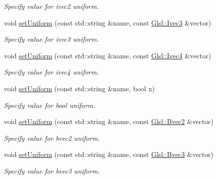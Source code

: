 \begin{DoxyCompactItemize}
\begin{DoxyCompactList}\small\item\em Specify value for {\ttfamily ivec2} uniform. \end{DoxyCompactList}\item 
void \mbox{\hyperlink{classsf_1_1_shader_a9e328e3e97cd753fdc7b842f4b0f202e}{set\+Uniform}} (const std\+::string \&name, const \mbox{\hyperlink{namespacesf_1_1_glsl_a64f403dd0219e7f128ffddca641394df}{Glsl\+::\+Ivec3}} \&vector)
\begin{DoxyCompactList}\small\item\em Specify value for {\ttfamily ivec3} uniform. \end{DoxyCompactList}\item 
void \mbox{\hyperlink{classsf_1_1_shader_a380e7a5a2896162c5fd08966c4523790}{set\+Uniform}} (const std\+::string \&name, const \mbox{\hyperlink{structsf_1_1priv_1_1_vector4}{Glsl\+::\+Ivec4}} \&vector)
\begin{DoxyCompactList}\small\item\em Specify value for {\ttfamily ivec4} uniform. \end{DoxyCompactList}\item 
void \mbox{\hyperlink{classsf_1_1_shader_af417027ac72c06e6cfbf30975cd678e9}{set\+Uniform}} (const std\+::string \&name, bool x)
\begin{DoxyCompactList}\small\item\em Specify value for {\ttfamily bool} uniform. \end{DoxyCompactList}\item 
void \mbox{\hyperlink{classsf_1_1_shader_ab2518b8dd0762e682b452a5d5005f2bf}{set\+Uniform}} (const std\+::string \&name, const \mbox{\hyperlink{namespacesf_1_1_glsl_a59d8cf909c3d71ebf3db057480b464da}{Glsl\+::\+Bvec2}} \&vector)
\begin{DoxyCompactList}\small\item\em Specify value for {\ttfamily bvec2} uniform. \end{DoxyCompactList}\item 
void \mbox{\hyperlink{classsf_1_1_shader_ab06830875c82476fbb9c975cdeb78a11}{set\+Uniform}} (const std\+::string \&name, const \mbox{\hyperlink{namespacesf_1_1_glsl_a4166ffc506619b4912d576e6eba2c957}{Glsl\+::\+Bvec3}} \&vector)
\begin{DoxyCompactList}\small\item\em Specify value for {\ttfamily bvec3} uniform. \end{DoxyCompactList}\item 

\end{DoxyCompactItemize}
